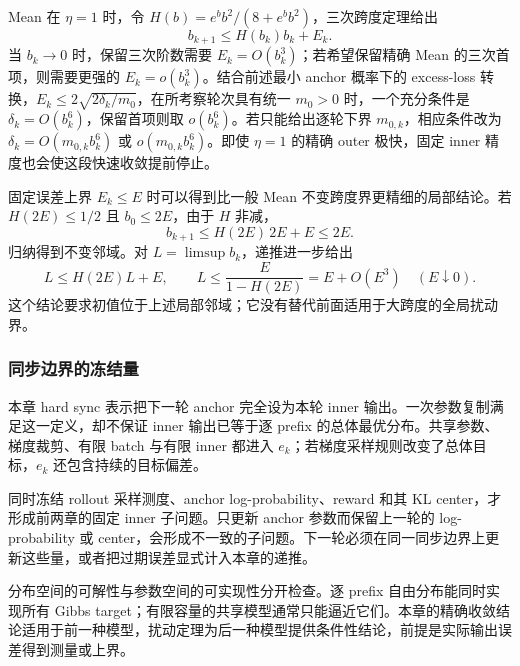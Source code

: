 Mean 在 $\eta=1$ 时，令 $H(b)=e^bb^2/(8+e^bb^2)$，三次跨度定理给出
\[
 b_{k+1}\le H(b_k)b_k+E_k.
\]
当 $b_k\to0$ 时，保留三次阶数需要 $E_k=O(b_k^3)$；若希望保留精确 Mean 的三次首项，则需要更强的 $E_k=o(b_k^3)$。结合前述最小 anchor 概率下的 excess-loss 转换，$E_k\le2\sqrt{2\delta_k/m_0}$，在所考察轮次具有统一 $m_0>0$ 时，一个充分条件是 $\delta_k=O(b_k^6)$，保留首项则取 $o(b_k^6)$。若只能给出逐轮下界 $m_{0,k}$，相应条件改为 $\delta_k=O(m_{0,k}b_k^6)$ 或 $o(m_{0,k}b_k^6)$。即使 $\eta=1$ 的精确 outer 极快，固定 inner 精度也会使这段快速收敛提前停止。

固定误差上界 $E_k\le E$ 时可以得到比一般 Mean 不变跨度界更精细的局部结论。若 $H(2E)\le1/2$ 且 $b_0\le2E$，由于 $H$ 非减，
\[
 b_{k+1}\le H(2E)\,2E+E\le2E.
\]
归纳得到不变邻域。对 $L=\limsup b_k$，递推进一步给出
\[
 L\le H(2E)L+E,
 \qquad L\le\frac{E}{1-H(2E)}=E+O(E^3)
 \quad(E\downarrow0).
\]
这个结论要求初值位于上述局部邻域；它没有替代前面适用于大跨度的全局扰动界。

\subsubsection{同步边界的冻结量}

本章 hard sync 表示把下一轮 anchor 完全设为本轮 inner 输出。一次参数复制满足这一定义，却不保证 inner 输出已等于逐 prefix 的总体最优分布。共享参数、梯度裁剪、有限 batch 与有限 inner 都进入 $e_k$；若梯度采样规则改变了总体目标，$e_k$ 还包含持续的目标偏差。

同时冻结 rollout 采样测度、anchor log-probability、reward 和其 KL center，才形成前两章的固定 inner 子问题。只更新 anchor 参数而保留上一轮的 log-probability 或 center，会形成不一致的子问题。下一轮必须在同一同步边界上更新这些量，或者把过期误差显式计入本章的递推。

分布空间的可解性与参数空间的可实现性分开检查。逐 prefix 自由分布能同时实现所有 Gibbs target；有限容量的共享模型通常只能逼近它们。本章的精确收敛结论适用于前一种模型，扰动定理为后一种模型提供条件性结论，前提是实际输出误差得到测量或上界。

